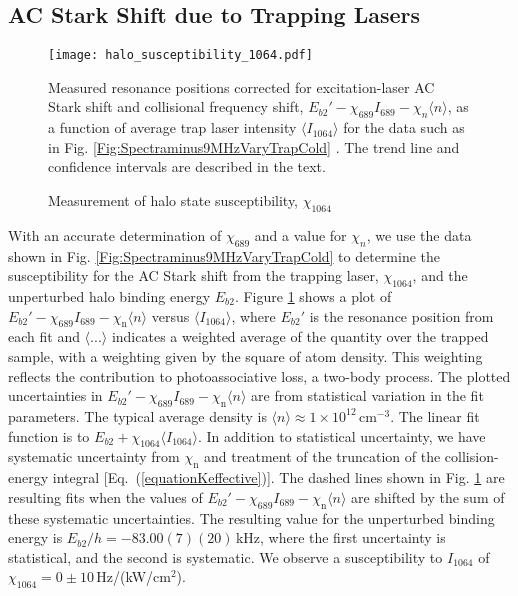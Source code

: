 \subsection{AC Stark Shift due to Trapping Lasers}

\begin{figure} \label{Fig:ShiftWithTrapIntensity}
 \centerline{
 \texttt{[image: halo\_susceptibility\_1064.pdf]}}
  \caption{Measurement of halo state susceptibility, $\chi_{1064}$}{Measured resonance positions corrected for excitation-laser AC Stark shift and collisional frequency shift, $E_{b2}'-\chi_{689} I_{689} - \chi_{n}\langle n\rangle$, as a function of average trap laser intensity $\langle I_{1064} \rangle$ for the data such as in Fig. \ref{Fig:Spectraminus9MHzVaryTrapCold} . The trend line and confidence intervals are described in the text.}
\end{figure}

With an accurate determination of $\chi_{689}$ and a value for $\chi_n$, we use the data shown in Fig. \ref{Fig:Spectraminus9MHzVaryTrapCold} to determine the susceptibility for the AC Stark shift from the trapping laser, $\chi_{1064}$, and the unperturbed halo binding energy $E_{b2}$. Figure \ref{Fig:ShiftWithTrapIntensity} shows a plot of $E_{b2}'-\chi_{689}I_{689} - \chi_{\text{n}}\langle n\rangle$ versus $\langle I_{1064} \rangle $, where $E_{b2}'$ is the resonance position from each fit and $\langle ... \rangle $ indicates a weighted average of the quantity over the trapped sample, with a weighting given by the square of atom density. This weighting reflects the contribution to photoassociative loss, a two-body process. The plotted uncertainties in $E_{b2}'-\chi_{689}I_{689} - \chi_{\text{n}}\langle n\rangle$ are from statistical variation in the fit parameters. The typical average density is $\langle n\rangle\approx 1\times 10^{12}$\,cm$^{-3}$. The linear fit function is to $E_{b2}+\chi_{1064}\langle I_{1064} \rangle $. In addition to statistical uncertainty, we have systematic uncertainty from $\chi_{\text{n}}$ and treatment of the truncation of the collision-energy integral [Eq.\ (\ref{equationKeffective})]. The dashed lines shown in Fig. \ref{Fig:ShiftWithTrapIntensity} are resulting fits when the values of $E_{b2}'-\chi_{689}I_{689} - \chi_{\text{n}}\langle n\rangle$ are shifted by the sum of these systematic uncertainties. The resulting value for the unperturbed binding energy is $E_{b2}/h=-83.00(7)(20)$\,kHz, where the first uncertainty is statistical, and the second is systematic. We observe a susceptibility to $I_{1064}$ of $\chi_{1064}=0\pm 10$\,Hz/(kW/cm$^2$).


